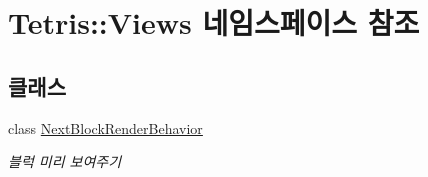 \hypertarget{namespace_tetris_1_1_views}{}\section{Tetris\+:\+:Views 네임스페이스 참조}
\label{namespace_tetris_1_1_views}
\subsection*{클래스}
\begin{DoxyCompactItemize}
\item 
class \hyperlink{class_tetris_1_1_views_1_1_next_block_render_behavior}{Next\+Block\+Render\+Behavior}
\begin{DoxyCompactList}\small\item\em 블럭 미리 보여주기 \end{DoxyCompactList}\end{DoxyCompactItemize}
